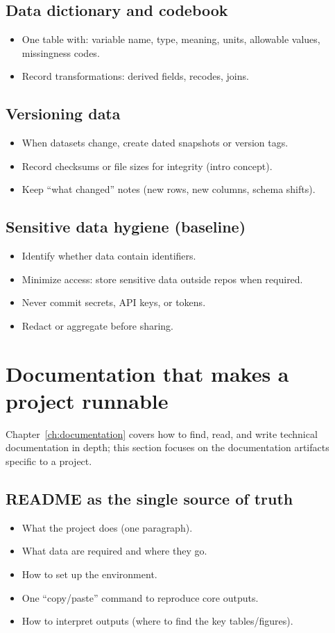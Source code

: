 \subsection{Data dictionary and codebook}
\begin{itemize}
\item One table with: variable name, type, meaning, units, allowable values, missingness codes.
\item Record transformations: derived fields, recodes, joins.
\end{itemize}

\subsection{Versioning data}
\begin{itemize}
\item When datasets change, create dated snapshots or version tags.
\item Record checksums or file sizes for integrity (intro concept).
\item Keep ``what changed'' notes (new rows, new columns, schema shifts).
\end{itemize}

\subsection{Sensitive data hygiene (baseline)}
\begin{itemize}
\item Identify whether data contain identifiers.
\item Minimize access: store sensitive data outside repos when required.
\item Never commit secrets, API keys, or tokens.
\item Redact or aggregate before sharing.
\end{itemize}

\section{Documentation that makes a project runnable}
Chapter~\ref{ch:documentation} covers how to find, read, and write technical documentation in depth; this section focuses on the documentation artifacts specific to a project.
\subsection{README as the single source of truth}
\begin{itemize}
\item What the project does (one paragraph).
\item What data are required and where they go.
\item How to set up the environment.
\item One ``copy/paste'' command to reproduce core outputs.
\item How to interpret outputs (where to find the key tables/figures).
\end{itemize}

